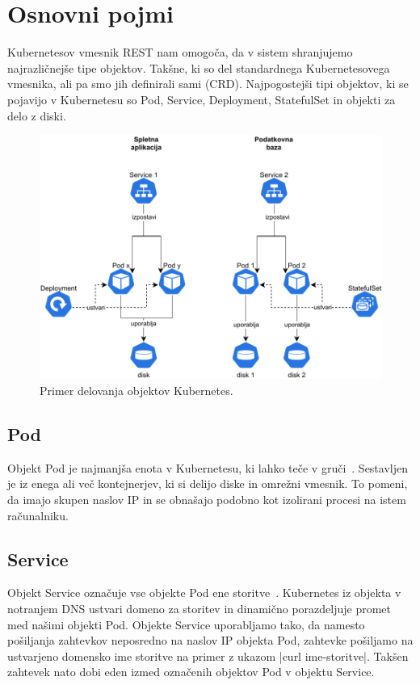 \documentclass[a4paper, 12pt]{book}
\begin{document}
\section{Osnovni pojmi}
Kubernetesov vmesnik REST nam omogoča, da v sistem shranjujemo najrazličnejše tipe objektov.
Takšne, ki so del standardnega Kubernetesovega vmesnika, ali pa smo jih definirali sami (CRD).
Najpogostejši tipi objektov, ki se pojavijo v Kubernetesu so Pod, Service, Deployment, StatefulSet in objekti za delo z diski.
\begin{figure}[h]
\begin{center}
\includegraphics[width=1.0\textwidth]{images/Kubernetes-simple-schema.pdf}
\end{center}
\caption{Primer delovanja objektov Kubernetes.}
\label{problem-povezanih-clustrov}
\end{figure}
\subsection{Pod}
Objekt Pod je najmanjša enota v Kubernetesu, ki lahko teče v gruči~\cite{pod}.
Sestavljen je iz enega ali več kontejnerjev, ki si delijo diske in omrežni vmesnik.
To pomeni, da imajo skupen naslov IP in se obnašajo podobno kot izolirani procesi na istem računalniku.
\subsection{Service}
Objekt Service označuje vse objekte Pod ene storitve~\cite{service}.
Kubernetes iz objekta v notranjem DNS ustvari domeno za storitev in dinamično porazdeljuje promet med našimi objekti Pod.
Objekte Service uporabljamo tako, da namesto pošiljanja zahtevkov neposredno na naslov IP objekta Pod, zahtevke pošiljamo na ustvarjeno domensko ime storitve na primer z ukazom \spverb|curl ime-storitve|.
Takšen zahtevek nato dobi eden izmed označenih objektov Pod v objektu Service.
\end{document}
